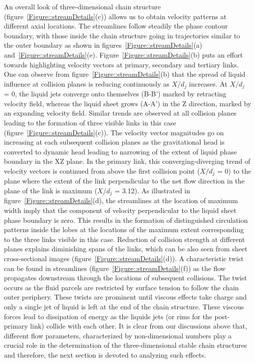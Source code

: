 \documentclass{jfm}
\begin{document}
An overall look of three-dimensional chain structure (figure~\ref{Figure::streamDetails}(c)) allows us to obtain velocity patterns at different axial locations. The streamlines follow steadily the phase contour boundary, with those inside the chain structure going in trajectories similar to the outer boundary as shown in figures~\ref{Figure::streamDetails}(a) and~\ref{Figure::streamDetails}(e). Figure~\ref{Figure::streamDetails}(b) puts an effort towards highlighting velocity vectors at primary, secondary and tertiary links. One can observe from figure~\ref{Figure::streamDetails}(b) that the spread of liquid influence at collision planes is reducing continuously as $X/d_j$ increases.  At $X/d_j$ = 0, the liquid jets converge onto themselves (B-B') marked by retracting velocity field, whereas the liquid sheet grows (A-A') in the Z direction, marked by an expanding velocity field. Similar trends are observed at all collision planes leading to the formation of three visible links in this case (figure~\ref{Figure::streamDetails}(c)). The velocity vector magnitudes go on increasing at each subsequent collision planes as the gravitational head is converted to dynamic head leading to narrowing of the extent of liquid phase boundary in the XZ plane. In the primary link, this converging-diverging trend of velocity vectors is continued from above the first collision point ($X/d_j$ = 0) to the plane where the extent of the link perpendicular to the net flow direction in the plane of the link is maximum ($X/d_j$ = 3.12). As illustrated in figure~\ref{Figure::streamDetails}(d), the streamlines at the location of maximum width imply that the component of velocity perpendicular to the liquid sheet phase boundary is zero. This results in the formation of distinguished circulation patterns inside the lobes at the locations of the maximum extent corresponding to the three links visible in this case. Reduction of collision strength at different planes explains diminishing spans of the links, which can be also seen from sheet cross-sectional images (figure~\ref{Figure::streamDetails}(d)). A characteristic twist can be found in streamlines (figure~\ref{Figure::streamDetails}(f)) as the flow propagates downstream through the locations of subsequent collisions. The twist occurs as the fluid parcels are restricted by surface tension to follow the chain outer periphery. These twists are prominent until viscous effects take charge and only a single jet of liquid is left at the end of the chain structure. These viscous forces lead to dissipation of energy as the liquids jets (or rims for the post-primary link) collide with each other. It is clear from our discussions above that, different flow parameters, characterized by non-dimensional numbers play a crucial role in the determination of the three-dimensional stable chain structures and therefore, the next section is devoted to analyzing such effects.
\end{document}

